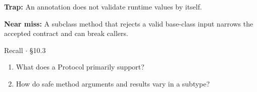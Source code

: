 \documentclass[11pt]{article}
\begin{document}
\begin{keepsection}
\begin{notebox}\textbf{Trap:} An annotation does not validate runtime values by itself.\end{notebox}

\begin{notebox}\textbf{Near miss:} A subclass method that rejects a valid base-class input narrows the accepted contract and can break callers.\end{notebox}

\begin{recallbox}{Recall \ensuremath{\cdot} §10.3}
\begin{enumerate}
\item What does a Protocol primarily support?
\item How do safe method arguments and results vary in a subtype?
\end{enumerate}

\end{recallbox}
\end{keepsection}
\end{document}
